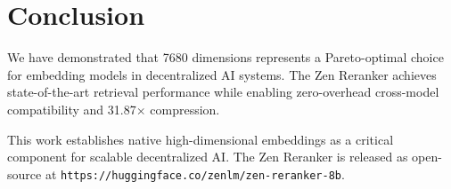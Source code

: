 \section{Conclusion}


We have demonstrated that 7680 dimensions represents a Pareto-optimal choice for embedding models in decentralized AI systems. The Zen Reranker achieves state-of-the-art retrieval performance while enabling zero-overhead cross-model compatibility and 31.87$\times$ compression.

This work establishes native high-dimensional embeddings as a critical component for scalable decentralized AI. The Zen Reranker is released as open-source at \texttt{https://huggingface.co/zenlm/zen-reranker-8b}.

